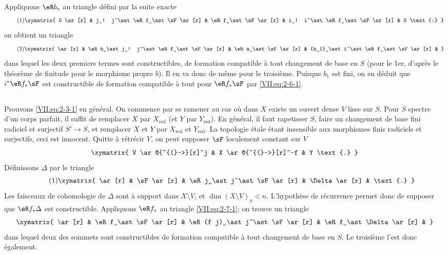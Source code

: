 Appliquons $\eR b_\ast$ au triangle défini par la suite exacte 
\begin{equation*}\tag{1}\label{VII:eq:2-6-1}
\xymatrix{
  0 \ar[r] 
    & j_! j^\ast \eR f_\ast \sF \ar[r] 
    & \eR f_\ast \sF \ar[r] 
    & i_! i^\ast \eR f_\ast \sF \ar[r] 
    & 0 \text{:} 
}
\end{equation*}
on obtient un triangle 
\begin{equation*}\tag{2}\label{VII:eq:2-6-2}
\xymatrix{
  \ar[r] 
    & \eR b_\ast j_! j^\ast \eR f_\ast \sF \ar[r] 
    & \eR a_\ast \sF \ar[r] 
    & {b_1}_\ast i^\ast \eR f_\ast \sF \ar[r] 
    & 
}
\end{equation*}
dans lequel les deux premiers termes sont constructibles, de formation 
compatible à tout changement de base en $S$ (pour le 1er, d'après le 
théorème de finitude pour le morphisme propre $b$). Il en va donc de 
même pour le troisième. Puisque $b_1$ est fini, on en déduit que 
$i^\ast \eR f_\ast \sF$ est constructible de formation compatible à tout 
 pour $\eR f_\ast \sF$ par 
\eqref{VII:eq:2-6-1}. 





\subsection{}\label{VII:2-7}

Prouvons \eqref{VII:eq:2-3-1} en général. On commence par se ramener au cas 
où dans $X$ existe un ouvert dense $V$ lisse sur $S$. Pour $S$ spectre d'un 
corps parfait, il suffit de remplacer $X$ par $X_\text{red}$ (et $Y$ par 
$Y_\text{red}$). En général, il faut rapetisser $S$, faire un changement de 
base fini radiciel et surjectif $S' \to S$, et remplacer $X$ et $Y$ par 
$X_\text{red}$ et $Y_\text{red}$. La topologie étale étant insensible aux 
morphismes finis radiciels et surjectifs, ceci est innocent. Quitte à 
rétrécir $V$, on peut supposer $\sF$ localement constant sur $V$ 
\[\xymatrix{
  V \ar@{^{(}->}[r]^j 
    & X \ar@{^{(}->}[r]^-f 
    & Y \text{.} 
}\]
Définissons $\Delta$ par le triangle 
\begin{equation*}\tag{1}\label{VII:eq:2-7-1}
\xymatrix{
  \ar[r] 
    & \sF \ar[r] 
    & \eR j_\ast j^\ast \sF \ar[r] 
    & \Delta \ar[r] 
    & \text{.} 
}
\end{equation*}
Les faisceaux de cohomologie de $\Delta$ sont à support dans $X\setminus V$, 
et $\dim(X\setminus V)_\eta < n$. L'hypothèse de récurrence permet donc de 
supposer que $\eR f_\ast \Delta$ est constructible. Appliquons $\eR f_\ast$ au 
triangle \eqref{VII:eq:2-7-1}; on trouve un triangle 
\[\xymatrix{
  \ar[r] 
    & \eR f_\ast \sF \ar[r] 
    & \eR(f j)_\ast j^\ast \sF \ar[r] 
    & \eR f_\ast \Delta \ar[r] 
    & 
}\]
dans lequel deux des sommets sont constructibles de formation compatible à 
tout changement de base en $S$. Le troisième l'est donc également. 





